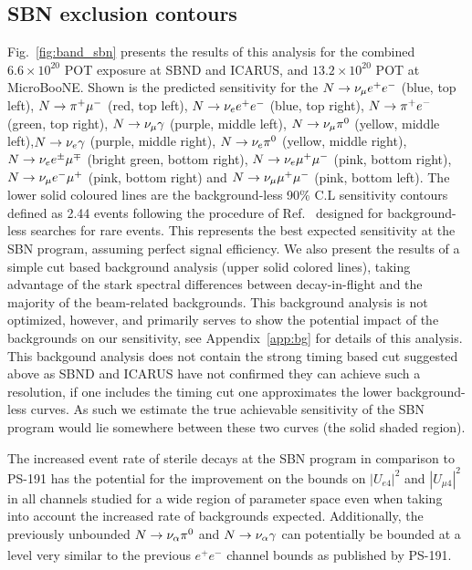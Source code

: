 \documentclass[11pt, a4paper]{article}
\newcommand{\reffig}[1]{Fig.~\ref{#1}}
\newcommand{\refapp}[1]{Appendix~\ref{#1}}
\newcommand{\refref}[1]{Ref.~\cite{#1}}
\def\muboone{MicroBooNE}
\def\ster{\ensuremath N}
\newcounter{CommentCount}
\newcommand{\marcom}[2]{\textsuperscript{\textcolor{#1}{\theCommentCount}}\marginpar{\textsuperscript{\textcolor{#1}{\theCommentCount}}\textcolor{#1}{{\small#1: #2}}}\stepcounter{CommentCount}}
\begin{document}
\subsection{SBN exclusion contours}
%
\reffig{fig:band_sbn} presents the results of this analysis for the combined
$6.6\times 10^{20}$ POT exposure at SBND and ICARUS, and $13.2\times10^{20}$
POT at \muboone. Shown is the predicted sensitivity for the $\ster \rightarrow
\nu_\mu e^+e^-$ (blue, top left), $\ster \rightarrow \pi^+ \mu^-$ (red, top
left), $\ster \rightarrow \nu_e e^+ e^-$ (blue, top right),  $\ster \rightarrow
\pi^+ e^-$ (green, top right), $\ster \rightarrow \nu_\mu \gamma$ (purple,
middle left), $\ster \rightarrow \nu_\mu \pi^0$ (yellow, middle left),$\ster
\rightarrow \nu_e \gamma$ (purple, middle right), $\ster \rightarrow \nu_e
\pi^0$ (yellow, middle right), $\ster \rightarrow \nu_e e^\pm \mu^\mp $ (bright
green, bottom right), $\ster \rightarrow \nu_e \mu^+ \mu^- $ (pink, bottom
right),  $\ster \rightarrow \nu_\mu e^- \mu^+$ (pink, bottom right) and $\ster
\rightarrow \nu_\mu \mu^+ \mu^- $ (pink, bottom left). The lower solid coloured
lines are the background-less 90\% C.L sensitivity contours defined as 2.44
events following the procedure of \refref{Feldman:1997qc} designed for
background-less searches for rare events. This represents the best expected
sensitivity at the SBN program, assuming perfect signal efficiency.  We also
present the results of a simple cut based background analysis (upper solid
colored lines), taking advantage of the stark spectral differences between
decay-in-flight and the majority of the beam-related backgrounds. This
background analysis is not optimized, however, and primarily serves to show the
potential impact of the backgrounds on our sensitivity,  see \refapp{app:bg}
for details of this analysis. This backgound analysis does not contain the
strong timing based cut suggested above as SBND and ICARUS have not confirmed
they can achieve such a resolution, if one includes the timing cut one
approximates the lower background-less curves. As such we estimate the true
achievable sensitivity of the SBN program would lie somewhere between these two
curves (the solid shaded region). 

The increased event rate of sterile decays at the SBN program in comparison to
PS-191 has the potential for the improvement on the bounds on $|U_{e4}|^2$ and
$|U_{\mu 4}|^2$ in all channels studied for a wide region of parameter space
even when taking into account the increased rate of backgrounds expected.
Additionally, the previously unbounded $\ster \rightarrow \nu_\alpha \pi^0$ and
$\ster \rightarrow \nu_\alpha \gamma$ can potentially be bounded at a level
very similar to the previous $e^+ e^-$ channel bounds as published by
PS-191.\marcom{PB}{This needs expanding.}
\end{document}
